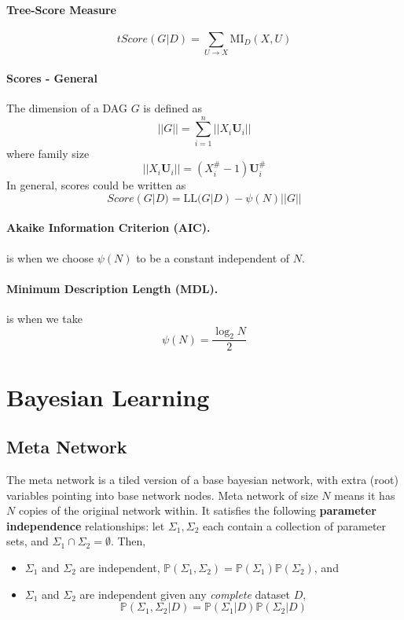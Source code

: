 \documentclass[11pt]{article}
\begin{document}
\paragraph{Tree-Score Measure}
\begin{equation}
	tScore(G|D) = \sum_{U \rightarrow X} \mathrm {MI}_D (X, U)
\end{equation}

\paragraph{Scores - General}
The dimension of a DAG $G$ is defined as
\begin{equation}
	||G|| = \sum_{i = 1}^n ||X_i \mathbf U_i ||
\end{equation}
where family size 
\begin{equation}
	||X_i \mathbf U_i || = (X_i^\# - 1) \mathbf U_i^\#
\end{equation}
In general, scores could be written as 
\begin{equation}
	Score(G|D) = \mathrm{LL}(G|D) - \psi (N) ||G||
\end{equation}

\paragraph{Akaike Information Criterion (AIC).} is when we choose $\psi (N)$ to be a constant independent of $N$. 

\paragraph{Minimum Description Length (MDL).} is when we take
\begin{equation}
	\psi(N) = \frac{\log_2 N}{2}
\end{equation} 

\section{Bayesian Learning}
\subsection{Meta Network}
The meta network is a tiled version of a base bayesian network, with extra (root) variables pointing into base network nodes. Meta network of size $N$ means it has $N$ copies of the original network within. It satisfies the following \textbf{parameter independence} relationships: let $\Sigma_1, \Sigma_2$ each contain a collection of parameter sets, and $\Sigma_1 \cap \Sigma_2 = \emptyset$. Then, 
\begin{itemize}
	\item $\Sigma_1$ and $\Sigma_2$ are independent, $\mathbb P (\Sigma_1, \Sigma_2) = \mathbb P (\Sigma_1 ) \mathbb P (\Sigma_2) $, and
	\item $\Sigma_1$ and $\Sigma_2$ are independent given any \textit{complete} dataset $D$, 
	\begin{equation}
		\mathbb P (\Sigma_1, \Sigma_2 | D) = \mathbb P (\Sigma_1 |D) \mathbb P (\Sigma_2 |D) 
	\end{equation}
\end{itemize}
\end{document}
